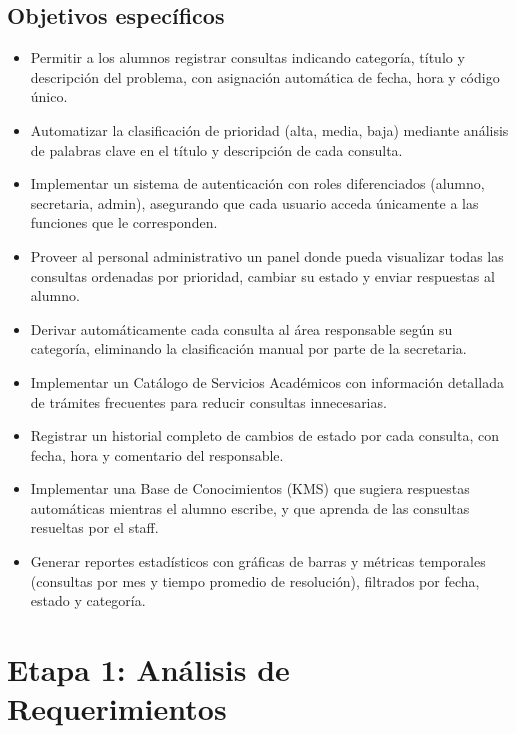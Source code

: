 \documentclass[12pt,a4paper]{article}
\begin{document}
	\subsection{Objetivos específicos}
	\begin{itemize}
	\setlength{\itemindent}{1cm}
	\item Permitir a los alumnos registrar consultas indicando categoría, título y descripción del problema, con asignación automática de fecha, hora y código único.
	\item Automatizar la clasificación de prioridad (alta, media, baja) mediante análisis de palabras clave en el título y descripción de cada consulta.
	\item Implementar un sistema de autenticación con roles diferenciados (alumno, secretaria, admin), asegurando que cada usuario acceda únicamente a las funciones que le corresponden.
	\item Proveer al personal administrativo un panel donde pueda visualizar todas las consultas ordenadas por prioridad, cambiar su estado y enviar respuestas al alumno.
	\item Derivar automáticamente cada consulta al área responsable según su categoría, eliminando la clasificación manual por parte de la secretaria.
	\item Implementar un Catálogo de Servicios Académicos con información detallada de trámites frecuentes para reducir consultas innecesarias.
	\item Registrar un historial completo de cambios de estado por cada consulta, con fecha, hora y comentario del responsable.
	\item Implementar una Base de Conocimientos (KMS) que sugiera respuestas automáticas mientras el alumno escribe, y que aprenda de las consultas resueltas por el staff.
	\item Generar reportes estadísticos con gráficas de barras y métricas temporales (consultas por mes y tiempo promedio de resolución), filtrados por fecha, estado y categoría.
	\end{itemize}

	\newpage

	\section{Etapa 1: Análisis de Requerimientos}
\end{document}
